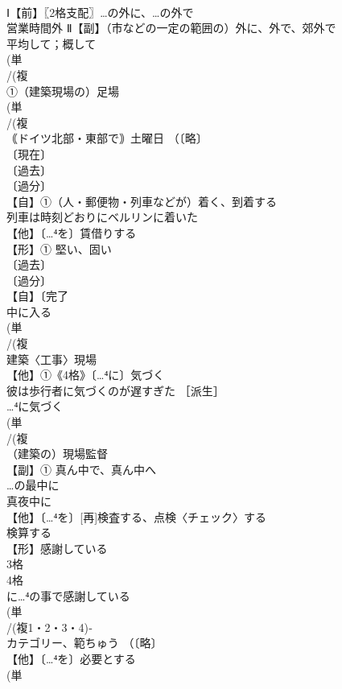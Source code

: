 \documentclass[8pt]{extreport}
\begin{document}
\begin{CJK}{UTF8}{min}
\\	Ⅰ【前】〖2格支配〗…の外に、…の外で 
\\	営業時間外 Ⅱ【副】（市などの一定の範囲の）外に、外で、郊外で
\\	平均して；概して
\\	(単
\\	/(複
\\	①（建築現場の）足場 
\\	(単
\\	/(複
\\	｟ドイツ北部・東部で｠土曜日 （〔略〕
\\	〔現在〕
\\	〔過去〕
\\	〔過分〕
\\	【自】①（人・郵便物・列車などが）着く、到着する 
\\	列車は時刻どおりにベルリンに着いた 
\\	【他】〔…⁴を〕賃借りする 
\\	【形】① 堅い、固い
\\	〔過去〕
\\	〔過分〕
\\	【自】〔完了
\\	中に入る
\\	(単
\\	/(複
\\	建築〈工事〉現場 
\\	【他】①《4格》〔…⁴に〕気づく 
\\	彼は歩行者に気づくのが遅すぎた ［派生］ 
\\	…⁴に気づく
\\	(単
\\	/(複
\\	（建築の）現場監督 
\\	【副】① 真ん中で、真ん中へ　
\\	…の最中に　
\\	真夜中に
\\	【他】〔…⁴を〕[再]検査する、点検〈チェック〉する 
\\	検算する 
\\	【形】感謝している 
\\	3格
\\	4格 
\\	に…⁴の事で感謝している
\\	(単
\\	/(複1・2・3・4)‐
\\	カテゴリー、範ちゅう （〔略〕
\\	【他】〔…⁴を〕必要とする 
\\	(単

\end{CJK}
\end{document}
